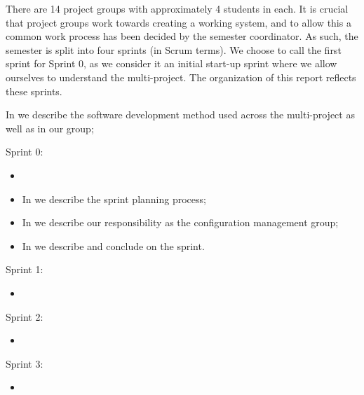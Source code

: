 There are 14 project groups with approximately 4 students in each. It is crucial that project groups work towards creating a working system, and to allow this a common work process has been decided by the semester coordinator. As such, the semester is split into four sprints (in Scrum terms). We choose to call the first sprint for Sprint 0, as we consider it an initial start-up sprint where we allow ourselves to understand the multi-project. 
The organization of this report reflects these sprints. 

\begin{documentorganization}
  \item In  we describe the software development method used across the multi-project as well as in our group;
  \item Sprint 0:
  \begin{itemize}
    \item {}
    \item In  we describe the sprint planning process;
    \item In  we describe our responsibility as the configuration management group;
    \item In  we describe and conclude on the sprint. 
  \end{itemize}
  \item Sprint 1:
  \begin{itemize}
    \item {}
  \end{itemize}
  \item Sprint 2:
  \begin{itemize}
    \item {}
  \end{itemize}
  \item Sprint 3:
  \begin{itemize}
    \item {}
  \end{itemize}
\end{documentorganization}